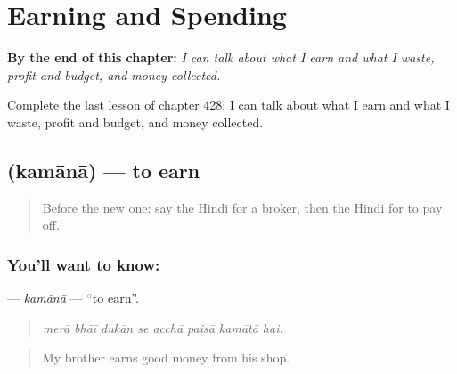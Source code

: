 
\chapter{Earning and Spending}
\label{ch:hi-earning-and-spending}

\begin{chapteropening}
\textbf{By the end of this chapter:} \emph{I can talk about what I earn and what I waste, profit and budget, and money collected.}

Complete the last lesson of chapter 428: I can talk about what I earn and what I waste, profit and budget, and money collected.
\end{chapteropening}

\section[\texorpdfstring{\hi{कमाना} (kamānā)}{कमाना (kamānā)}]{ (kamānā) — to earn}

\label{lesson:HI-C428-kamana}



\begin{quote}
Before the new one: say the Hindi for a broker, then the Hindi for to pay off.
\end{quote}

\subsection*{You'll want to know: }
\textbf{} — \emph{kamānā} — \textquotedblleft{}to earn\textquotedblright{}.

\begin{quote}
       
\end{quote}

\begin{quote}
\emph{merā bhāī dukān se acchā paisā kamātā hai.}
\end{quote}

\begin{quote}
My brother earns good money from his shop.
\end{quote}

